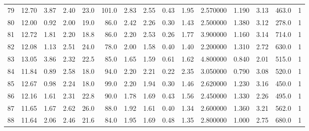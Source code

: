 \documentclass{article}
\begin{document}
\begin{tabular}{lrrrrrrrrrrrrrr}
    79  &    12.70 &        3.87 &  2.40 &               23.0 &      101.0 &           2.83 &        2.55 &                  0.43 &             1.95 &         2.570000 &  1.190 &                          3.13 &    463.0 &      1 \\
    80  &    12.00 &        0.92 &  2.00 &               19.0 &       86.0 &           2.42 &        2.26 &                  0.30 &             1.43 &         2.500000 &  1.380 &                          3.12 &    278.0 &      1 \\
    81  &    12.72 &        1.81 &  2.20 &               18.8 &       86.0 &           2.20 &        2.53 &                  0.26 &             1.77 &         3.900000 &  1.160 &                          3.14 &    714.0 &      1 \\
    82  &    12.08 &        1.13 &  2.51 &               24.0 &       78.0 &           2.00 &        1.58 &                  0.40 &             1.40 &         2.200000 &  1.310 &                          2.72 &    630.0 &      1 \\
    83  &    13.05 &        3.86 &  2.32 &               22.5 &       85.0 &           1.65 &        1.59 &                  0.61 &             1.62 &         4.800000 &  0.840 &                          2.01 &    515.0 &      1 \\
    84  &    11.84 &        0.89 &  2.58 &               18.0 &       94.0 &           2.20 &        2.21 &                  0.22 &             2.35 &         3.050000 &  0.790 &                          3.08 &    520.0 &      1 \\
    85  &    12.67 &        0.98 &  2.24 &               18.0 &       99.0 &           2.20 &        1.94 &                  0.30 &             1.46 &         2.620000 &  1.230 &                          3.16 &    450.0 &      1 \\
    86  &    12.16 &        1.61 &  2.31 &               22.8 &       90.0 &           1.78 &        1.69 &                  0.43 &             1.56 &         2.450000 &  1.330 &                          2.26 &    495.0 &      1 \\
    87  &    11.65 &        1.67 &  2.62 &               26.0 &       88.0 &           1.92 &        1.61 &                  0.40 &             1.34 &         2.600000 &  1.360 &                          3.21 &    562.0 &      1 \\
    88  &    11.64 &        2.06 &  2.46 &               21.6 &       84.0 &           1.95 &        1.69 &                  0.48 &             1.35 &         2.800000 &  1.000 &                          2.75 &    680.0 &      1 \\

\end{tabular}
\end{document}
